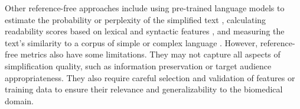 Other reference-free approaches include using pre-trained language models to estimate the probability or perplexity of the simplified text \cite{ke-etal-2022-ctrleval}, calculating readability scores based on lexical and syntactic features \cite{Truica2023-au}, and measuring the text's similarity to a corpus of simple or complex language \cite{Truica2023-au}.
However, reference-free metrics also have some limitations. They may not capture all aspects of simplification quality, such as information preservation or target audience appropriateness. They also require careful selection and validation of features or training data to ensure their relevance and generalizability to the biomedical domain.